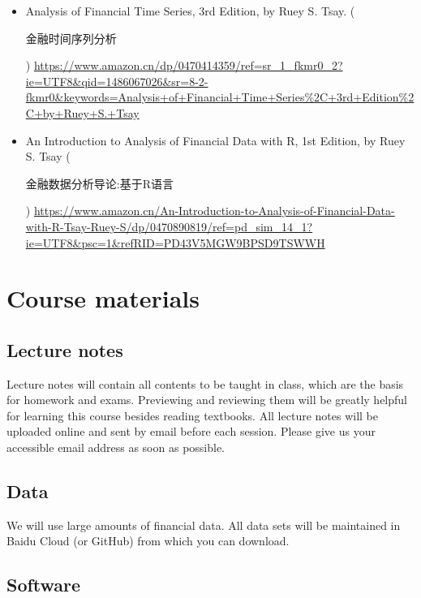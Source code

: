 \documentclass[a4paper,11pt]{article}
\begin{document}
\begin{itemize}
\item Analysis of Financial Time Series, 3rd Edition, by Ruey S. Tsay.
(\begin{CJK}{UTF8}{gbsn}金融时间序列分析\end{CJK})
\url{https://www.amazon.cn/dp/0470414359/ref=sr\_1\_fkmr0\_2?ie=UTF8\&qid=1486067026\&sr=8-2-fkmr0\&keywords=Analysis+of+Financial+Time+Series\%2C+3rd+Edition\%2C+by+Ruey+S.+Tsay}

\item An Introduction to Analysis of Financial Data with R, 1st Edition,
by Ruey S. Tsay (\begin{CJK}{UTF8}{gbsn}金融数据分析导论:基于R语言
\end{CJK}) \url{https://www.amazon.cn/An-Introduction-to-Analysis-of-Financial-Data-with-R-Tsay-Ruey-S/dp/0470890819/ref=pd\_sim\_14\_1?ie=UTF8\&psc=1\&refRID=PD43V5MGW9BPSD9TSWWH}
\end{itemize}


\section{Course materials}
\label{sec:org8aa4283}

\subsection*{Lecture notes}
\label{sec:org04566ce}

Lecture notes will contain all contents to be taught in class, which
are the basis for homework and exams. Previewing and reviewing them
will be greatly helpful for learning this course besides reading
textbooks. All lecture notes will be uploaded online and sent by email before
each session. Please give us your accessible email address as soon as
possible.

\subsection*{Data}
\label{sec:org8c949f9}

We will use large amounts of financial data. All data sets will be
maintained in Baidu Cloud (or GitHub) from which you can download.

\subsection*{Software}
\label{sec:org77be584}
\end{document}
